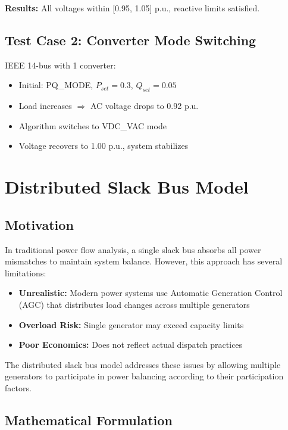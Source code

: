 \documentclass[11pt]{article}
\begin{document}
\textbf{Results:} All voltages within [0.95, 1.05] p.u., reactive limits satisfied.

\subsection{Test Case 2: Converter Mode Switching}

IEEE 14-bus with 1 converter:

\begin{itemize}
    \item Initial: PQ\_MODE, $P_{set}=0.3$, $Q_{set}=0.05$
    \item Load increases $\Rightarrow$ AC voltage drops to 0.92 p.u.
    \item Algorithm switches to VDC\_VAC mode
    \item Voltage recovers to 1.00 p.u., system stabilizes
\end{itemize}

\section{Distributed Slack Bus Model}

\subsection{Motivation}

In traditional power flow analysis, a single slack bus absorbs all power mismatches to maintain system balance. However, this approach has several limitations:

\begin{itemize}
    \item \textbf{Unrealistic:} Modern power systems use Automatic Generation Control (AGC) that distributes load changes across multiple generators
    \item \textbf{Overload Risk:} Single generator may exceed capacity limits
    \item \textbf{Poor Economics:} Does not reflect actual dispatch practices
\end{itemize}

The distributed slack bus model addresses these issues by allowing multiple generators to participate in power balancing according to their participation factors.

\subsection{Mathematical Formulation}
\end{document}
